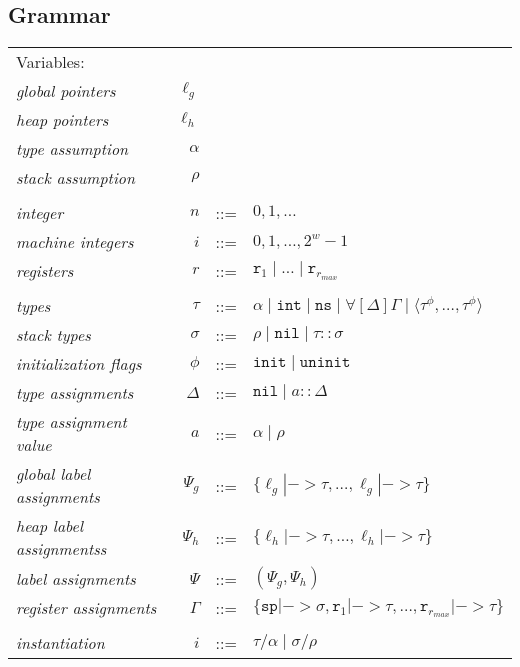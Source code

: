 \subsection{Grammar}

\begin{tabular}{lrcl}
Variables: \\
\textit{global pointers}          & $\ell_g$ \\
\textit{heap pointers}            & $\ell_h$ \\
\textit{type assumption}          & $\alpha$ \\
\textit{stack assumption}         & $\rho$ \\
\\
\textit{integer}                  & $n$ & ::= & $0, 1, \dots$ \\
\textit{machine integers}         & $i$ & ::= & $0, 1, \dots, 2^{w}-1$ \\
\textit{registers}                & $r$ & ::= & $\mathtt{r}_1 \mid \dots \mid \mathtt{r}_{r_{max}}$ \\
\\
\textit{types}                    & $\tau$ & ::= & $\alpha \mid \mathtt{int} \mid \mathtt{ns} \mid \mathtt\forall[ \Delta ] \Gamma \mid \langle\tau^\phi,\dots,\tau^\phi\rangle$ \\
\textit{stack types}              & $\sigma$ & ::= & $\rho \mid \mathtt{nil} \mid \tau :: \sigma$ \\
\textit{initialization flags}     & $\phi$ & ::= & $\mathtt{init} \mid \mathtt{uninit}$ \\
\textit{type assignments}         & $\Delta$ & ::= & $\mathtt{nil} \mid a :: \Delta$ \\
\textit{type assignment value}    & $a$ & ::= & $\alpha \mid \rho$ \\
\textit{global label assignments} & $\Psi_g$ & ::= & $\{\ell_g |-> \tau, \dots, \ell_g |-> \tau\}$ \\
\textit{heap label assignmentss}  & $\Psi_h$ & ::= & $\{\ell_h |-> \tau, \dots, \ell_h |-> \tau\}$ \\
\textit{label assignments}        & $\Psi$ & ::= & $(\Psi_g , \Psi_h)$ \\
\textit{register assignments}     & $\Gamma$ & ::= & $\{\mathtt{sp} |-> \sigma, \mathtt{r}_1 |-> \tau, \dots, \mathtt{r}_{r_{max}} |-> \tau\}$ \\
\\
\textit{instantiation}            & $i$ & ::= & $\tau/\alpha \mid \sigma/\rho$ \\

\end{tabular}
